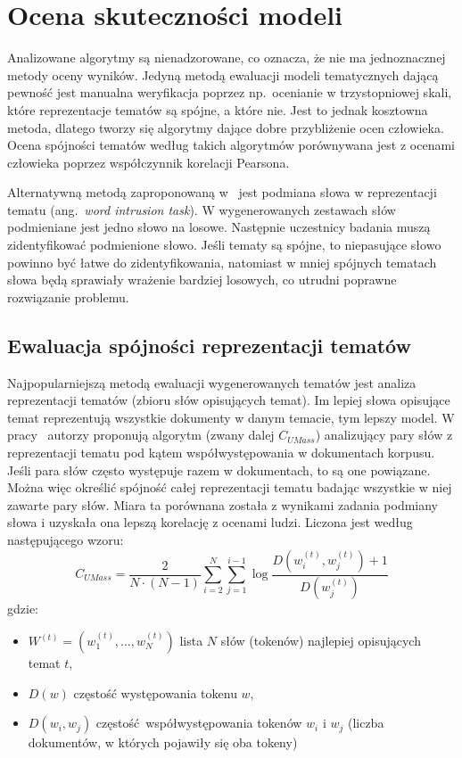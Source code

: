 
\chapter{Ocena skuteczności modeli}
	Analizowane algorytmy są nienadzorowane, co oznacza, że nie ma jednoznacznej metody oceny wyników.
	Jedyną metodą ewaluacji modeli tematycznych dającą pewność jest manualna weryfikacja poprzez np.\ ocenianie w trzystopniowej skali,
		które reprezentacje tematów są spójne, a które nie.
	Jest to jednak kosztowna metoda, dlatego tworzy się algorytmy dające dobre przybliżenie ocen człowieka.
	Ocena spójności tematów według takich algorytmów porównywana jest z ocenami człowieka poprzez współczynnik korelacji Pearsona.

	Alternatywną metodą zaproponowaną w~\cite{Word_intrusion} jest podmiana słowa w reprezentacji tematu (ang.\ \emph{word intrusion task}).
	W wygenerowanych zestawach słów podmieniane jest jedno słowo na losowe.
	Następnie uczestnicy badania muszą zidentyfikować podmienione słowo.
	Jeśli tematy są spójne, to niepasujące słowo powinno być łatwe do zidentyfikowania,
		natomiast w mniej spójnych tematach słowa będą sprawiały wrażenie bardziej losowych, co utrudni poprawne rozwiązanie problemu.

\section{Ewaluacja spójności reprezentacji tematów}\label{sec:coherence_scores}
	Najpopularniejszą metodą ewaluacji wygenerowanych tematów jest analiza reprezentacji tematów (zbioru słów opisujących temat).
	Im lepiej słowa opisujące temat reprezentują wszystkie dokumenty w danym temacie, tym lepszy model.
	W pracy~\cite{U_MASS} autorzy proponują algorytm (zwany dalej \(C_{UMass}\))
		analizujący pary słów z reprezentacji tematu pod kątem współwystępowania w dokumentach korpusu.
	Jeśli para słów często występuje razem w dokumentach, to są one powiązane.
	Można więc określić spójność całej reprezentacji tematu badając wszystkie w niej zawarte pary słów.
	Miara ta porównana została z wynikami zadania podmiany słowa i uzyskała ona lepszą korelację z ocenami ludzi.
	Liczona jest według następującego wzoru:
	\[ C_{UMass} = \frac{2}{N\cdot (N-1)} \sum_{i=2}^N \sum_{j=1}^{i-1} \log\frac{D\left(w_i^{(t)}, w_j^{(t)}\right) + 1}{D\left(w_j^{(t)}\right)} \]
	gdzie:
	\begin{itemize}
		\item \(W^{(t)} = \left(w_1^{(t)}, \ldots, w_N^{(t)}\right)\) lista \(N\) słów (tokenów) najlepiej opisujących temat \(t\),
		\item \(D(w)\) częstość występowania tokenu \(w\),
		\item \(D(w_i, w_j)\) częstość współwystępowania tokenów \(w_i\) i \(w_j\) (liczba dokumentów, w których pojawiły się oba tokeny)
	\end{itemize}

